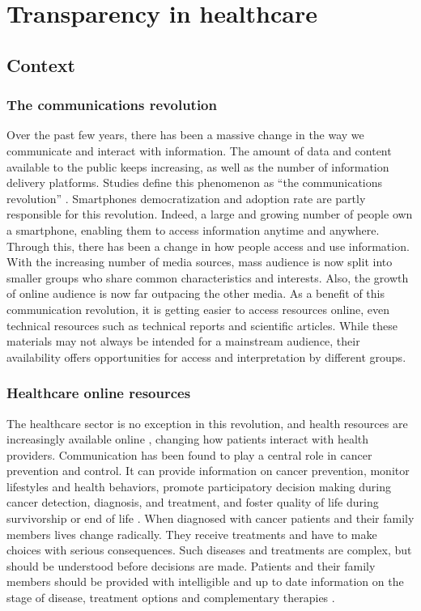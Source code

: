 \chapter{Transparency in healthcare}

\section{Context}

\subsection{The communications revolution}

Over the past few years, there has been a massive change in the way we communicate and interact with information. The amount of data and content available to the public keeps increasing, as well as the number of information delivery platforms. Studies define this phenomenon as ``the communications revolution'' \cite{viswanath_communications_2012}. Smartphones democratization and adoption rate are partly responsible for this revolution. Indeed, a large and growing number of people own a smartphone, enabling them to access information anytime and anywhere. Through this, there has been a change in how people access and use information. With the increasing number of media sources, mass audience is now split into smaller groups who share common characteristics and interests. Also, the growth of online audience is now far outpacing the other media. As a benefit of this communication revolution, it is getting easier to access resources online, even technical resources such as technical reports and scientific articles. While these materials may not always be intended for a mainstream audience, their availability offers opportunities for access and interpretation by different groups.

\subsection{Healthcare online resources}

The healthcare sector is no exception in this revolution, and health resources are increasingly available online \cite{viswanath_science_2005,viswanath_communications_2012}, changing how patients interact with health providers. Communication has been found to play a central role in cancer prevention and control. It can provide information on cancer prevention, monitor lifestyles and health behaviors, promote participatory decision making during cancer detection, diagnosis, and treatment, and foster quality of life during survivorship or end of life \cite{viswanath_communications_2012}. When diagnosed with cancer patients and their family members lives change radically. They receive treatments and have to make choices with serious consequences. Such diseases and treatments are complex, but should be understood before decisions are made. Patients and their family members should be provided with intelligible and up to date information on the stage of disease, treatment options and complementary therapies \cite{butow_dynamics_1997,cassileth_information_1980}.


